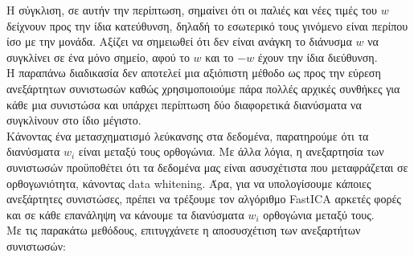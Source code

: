 \gr Η σύγκλιση, σε αυτήν την περίπτωση, σημαίνει ότι οι παλιές και νέες τιμές του \en $w$ \gr δείχνουν προς την ίδια κατεύθυνση, δηλαδή το εσωτερικό τους γινόμενο είναι περίπου ίσο με την μονάδα. Αξίζει να σημειωθεί ότι δεν είναι ανάγκη το διάνυσμα \en $w$ \gr να συγκλίνει σε ένα μόνο σημείο, αφού το \en $w$ \gr και το \en $-w$ \gr έχουν την ίδια διεύθυνση.
\\ [0.5 \baselineskip]
Η παραπάνω διαδικασία δεν αποτελεί μια αξιόπιστη μέθοδο ως προς την εύρεση ανεξάρτητων συνιστωσών καθώς χρησιμοποιούμε πάρα πολλές αρχικές συνθήκες για κάθε μια συνιστώσα και υπάρχει περίπτωση δύο διαφορετικά διανύσματα να συγκλίνουν στο ίδιο μέγιστο. 
\\ [0.5 \baselineskip]
Κάνοντας ένα μετασχηματισμό λεύκανσης στα δεδομένα, παρατηρούμε ότι τα διανύσματα \en $w_i$ \gr είναι μεταξύ τους ορθογώνια. Με άλλα λόγια, η ανεξαρτησία των συνιστωσών προϋποθέτει ότι τα δεδομένα μας είναι ασυσχέτιστα που μεταφράζεται σε ορθογωνιότητα, κάνοντας \en data whitening. \gr Άρα, για να υπολογίσουμε κάποιες ανεξάρτητες συνιστώσες, πρέπει να τρέξουμε τον αλγόριθμο \en FastICA \gr αρκετές φορές και σε κάθε επανάληψη να κάνουμε τα διανύσματα \en $w_i$ \gr ορθογώνια μεταξύ τους. 
\\ [0.5 \baselineskip]
Με τις παρακάτω μεθόδους, επιτυγχάνετε η αποσυσχέτιση των ανεξαρτήτων συνιστωσών:
